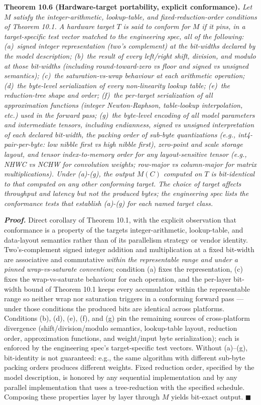 \documentclass[
]{article}
\begin{document}
\textbf{Theorem 10.6 (Hardware-target portability, explicit
conformance).} \emph{Let $M$ satisfy the integer-arithmetic,
lookup-table, and fixed-reduction-order conditions of Theorem 10.1.
A hardware target $T$ is said to \emph{conform} for $M$ if it pins,
in a target-specific test vector matched to the engineering spec,
all of the following: (a)~signed integer representation (two's
complement) at the bit-widths declared by the model description;
(b)~the result of every left/right shift, division, and modulo at
those bit-widths (including round-toward-zero vs floor and signed
vs unsigned semantics); (c)~the saturation-vs-wrap behaviour at each
arithmetic operation; (d)~the byte-level serialization of every
non-linearity lookup table; (e)~the reduction-tree shape and order;
(f)~the per-target serialization of all approximation functions
(integer Newton-Raphson, table-lookup interpolation, etc.) used in
the forward pass; (g)~the byte-level encoding of all model
parameters and intermediate tensors, including endianness, signed
vs unsigned interpretation of each declared bit-width, the packing
order of sub-byte quantizations (e.g., int4-pair-per-byte: low
nibble first vs high nibble first), zero-point and scale storage
layout, and tensor index-to-memory order for any layout-sensitive
tensor (e.g., NHWC vs NCHW for convolution weights; row-major vs
column-major for matrix multiplications). Under (a)-(g), the output
$M(C)$ computed on $T$ is bit-identical to that computed on any
other conforming target. The choice of target affects throughput
and latency but not the produced bytes; the engineering spec lists
the conformance tests that establish (a)-(g) for each named target
class.}

\emph{\textbf{Proof.}} Direct corollary of Theorem 10.1, with the
explicit observation that conformance is a property of the
target\textquotesingle s integer-arithmetic, lookup-table, and
data-layout semantics rather than of its parallelism strategy or
vendor identity. Two's-complement signed integer addition and
multiplication at a fixed bit-width are associative and commutative
\emph{within the representable range and under a pinned wrap-vs-saturate
convention}; condition (a) fixes the representation, (c) fixes the
wrap-vs-saturate behaviour for each operation, and the per-layer
bit-width bound of Theorem 10.1 keeps every accumulator within the
representable range so neither wrap nor saturation triggers in a
conforming forward pass --- under those conditions the produced
bits are identical across platforms. Conditions (b), (d), (e), (f),
and (g) pin the remaining sources of cross-platform divergence
(shift/division/modulo semantics, lookup-table layout, reduction
order, approximation functions, and weight/input byte
serialization); each is enforced by the engineering spec's
target-specific test vectors. Without (a)--(g), bit-identity is
not guaranteed: e.g., the same algorithm with different sub-byte
packing orders produces different weights. Fixed reduction order,
specified by the model description, is honored by any sequential
implementation and by any parallel implementation that uses a
tree-reduction with the specified schedule. Composing these properties
layer by layer through $M$ yields bit-exact output. \hfill$\blacksquare$
\end{document}

